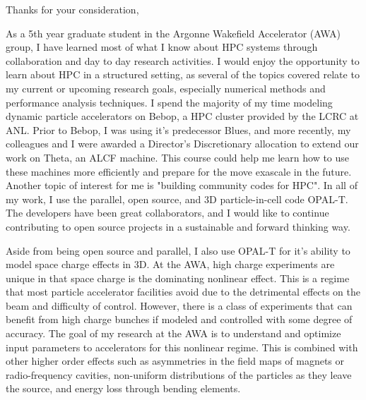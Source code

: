 \documentclass[11pt,a4paper,sans]{moderncv}        %
\begin{document}
\iffalse
{}
\date{March 15, 2018}
\opening{}
\closing{Thanks for your consideration,}
\makelettertitle
\vspace{-4em}

As a 5th year graduate student in the Argonne Wakefield Accelerator (AWA) group,
I have learned most of what I know about HPC systems through collaboration and
day to day research activities. I would enjoy the opportunity to learn about HPC in a structured setting, as several of the topics covered relate to my current or upcoming research goals, 
especially numerical methods and performance analysis techniques. 
I spend the majority of my time modeling  
dynamic particle accelerators on Bebop, a HPC cluster provided by the 
LCRC at ANL. Prior to Bebop, I was using it's predecessor Blues, and more recently,
my colleagues and I were awarded a Director's Discretionary
allocation to extend our work on Theta,
an ALCF machine.
This course could help me learn how to use these machines more efficiently 
and prepare for the move exascale in the future.
Another topic of interest for me is "building community codes for HPC". 
In all of my work, I use the parallel, open source, and
3D particle-in-cell code OPAL-T. The developers have been great collaborators, 
and I would like to continue contributing to open source projects in 
a sustainable and forward thinking way.

Aside from being open source and parallel, I also use OPAL-T for it's ability to model space charge effects in 3D.
At the AWA, high charge experiments are unique
in that space charge is the dominating nonlinear effect. This is a regime that most
particle accelerator facilities avoid due to the detrimental effects on the beam
and difficulty of control.
However, there is a class of experiments that can benefit from high charge bunches
if modeled and controlled with some degree of accuracy. The goal of my research
at the AWA is to understand and optimize input parameters to accelerators for
this nonlinear regime. This is combined with other higher order effects 
such as asymmetries in the field maps of magnets or radio-frequency cavities, 
non-uniform distributions of the particles as they leave the source, 
and energy loss through bending elements.
\end{document}
